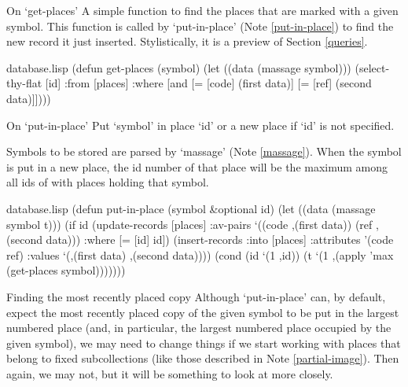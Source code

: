 \begin{notate}{On `get-places'} \label{get-places}
A simple function to find the places that are marked with
a given symbol.  This function is called by `put-in-place'
(Note \ref{put-in-place}) to find the new record it just
inserted.  Stylistically, it is a preview of Section
\ref{queries}.
\end{notate}

\begin{common}{database.lisp}
(defun get-places (symbol)
  (let ((data (massage symbol)))
    (select-thy-flat [id]
                     :from [places]
                     :where [and [= [code] (first data)]
                                 [= [ref] (second data)]])))
\end{common}

\begin{notate}{On `put-in-place'} \label{put-in-place}
Put `symbol' in place `id' or a new place if `id' is not
specified.

Symbols to be stored are parsed by
`massage' (Note
\ref{massage}).  When the symbol is put in
a new place, the id number of that place will be the
maximum among all ids of with places holding that symbol.
\end{notate}

\begin{common}{database.lisp}
(defun put-in-place (symbol &optional id)
  (let ((data (massage symbol t)))
    (if id
        (update-records [places]
                        :av-pairs `((code ,(first data))
                                    (ref ,(second data)))
                        :where [= [id] id])
        (insert-records :into [places]
                        :attributes '(code ref)
                        :values `(,(first data)
                                  ,(second data))))
    (cond
      (id `(1 ,id))
      (t `(1 ,(apply 'max (get-places symbol)))))))
\end{common}

\begin{notate}{Finding the most recently placed copy}
Although `put-in-place' can, by default, expect the most
recently placed copy of the given symbol to be put in
the largest numbered place (and, in particular, the
largest numbered place occupied by the given symbol), we
may need to change things if we start working with places
that belong to fixed subcollections (like those
described in Note \ref{partial-image}).  Then again, we may
not, but it will be something to look at more closely.
\end{notate}

